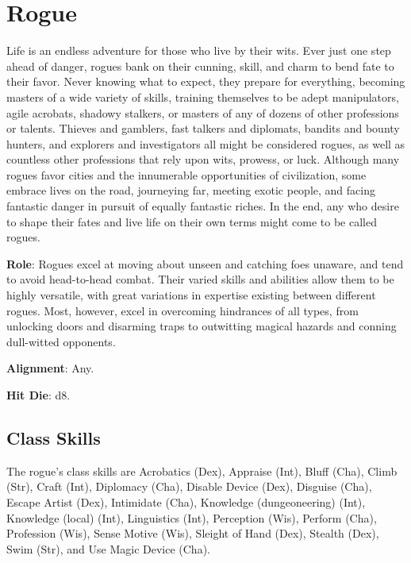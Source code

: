 \section{Rogue}

\label{f0}				
Life is an endless adventure for those who live by their wits. Ever just one step ahead of danger, rogues bank on their cunning, skill, and charm to bend fate to their favor. Never knowing what to expect, they prepare for everything, becoming masters of a wide variety of skills, training themselves to be adept manipulators, agile acrobats, shadowy stalkers, or masters of any of dozens of other professions or talents. Thieves and gamblers, fast talkers and diplomats, bandits and bounty hunters, and explorers and investigators all might be considered rogues, as well as countless other professions that rely upon wits, prowess, or luck. Although many rogues favor cities and the innumerable opportunities of civilization, some embrace lives on the road, journeying far, meeting exotic people, and facing fantastic danger in pursuit of equally fantastic riches. In the end, any who desire to shape their fates and live life on their own terms might come to be called rogues.
				
\textbf{Role}: Rogues excel at moving about unseen and catching foes unaware, and tend to avoid head-to-head combat. Their varied skills and abilities allow them to be highly versatile, with great variations in expertise existing between different rogues. Most, however, excel in overcoming hindrances of all types, from unlocking doors and disarming traps to outwitting magical hazards and conning dull-witted opponents.
				
\textbf{Alignment}: Any.
				
\textbf{Hit Die}: d8.
				
\subsection{Class Skills}

				
The rogue's class skills are Acrobatics (Dex), Appraise (Int), Bluff (Cha), Climb (Str), Craft (Int), Diplomacy (Cha), Disable Device (Dex), Disguise (Cha), Escape Artist (Dex), Intimidate (Cha), Knowledge (dungeoneering) (Int), Knowledge (local) (Int), Linguistics (Int), Perception (Wis), Perform (Cha), Profession (Wis), Sense Motive (Wis), Sleight of Hand (Dex), Stealth (Dex), Swim (Str), and Use Magic Device (Cha). 
				
